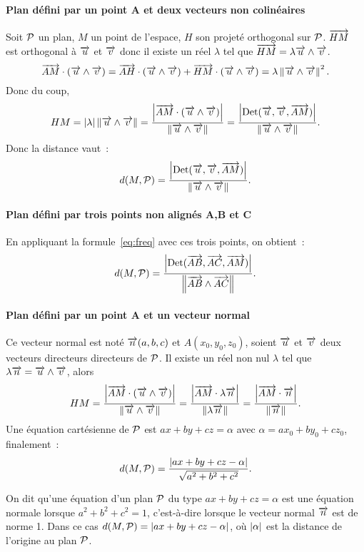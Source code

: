\paragraph{Plan défini par un point A et deux vecteurs non colinéaires}

Soit \(\P\) un plan, \(M\) un point de l'espace, \(H\) son projeté orthogonal sur \(\P\). \(\vect{HM}\) est orthogonal à \(\vu\) et \(\vv\) donc il existe un réel \(\lambda\) tel que \(\vect{HM}=\lambda \vu\wedge\vv\). 
\begin{equation}
  \vect{AM}\cdot(\vu\wedge\vv)=\vect{AH}\cdot(\vu\wedge\vv)+\vect{HM}\cdot(\vu\wedge\vv)=\lambda \norme{\vu\wedge\vv}^2.
\end{equation}
Donc du coup,
\begin{equation}
  HM=\abs{\lambda} \norme{\vu\wedge\vv}=\frac{\abs{\vect{AM}\cdot(\vu\wedge\vv)}}{\norme{\vu\wedge\vv}}=\frac{\abs{\Det(\vu,\vv,\vect{AM})}}{\norme{\vu\wedge\vv}}.
\end{equation}
Donc la distance vaut~:
\begin{equation}
  \label{eq:freq}
  d(M,\P)=\frac{\abs{\Det(\vu,\vv,\vect{AM})}}{\norme{\vu\wedge\vv}}.
\end{equation}

\paragraph{Plan défini par trois points non alignés A,B et C}

En appliquant la formule~\eqref{eq:freq} avec ces trois points, on obtient~:
\begin{equation}
  d(M,\P)=\frac{\abs{\Det(\vect{AB},\vect{AC},\vect{AM})}}{\norme{\vect{AB}\wedge\vect{AC}}}.
\end{equation}

\paragraph{Plan défini par un point A et un vecteur normal}

Ce vecteur normal est noté \(\vn(a,b,c)\) et \(A(x_0,y_0,z_0)\), soient \(\vu\) et \(\vv\) deux vecteurs directeurs directeurs de \(\P\). Il existe un réel non nul \(\lambda\) tel que \(\lambda\vn=\vu\wedge\vv\), alors
\begin{equation}
  HM=\frac{\abs{\vect{AM}\cdot(\vu\wedge\vv)}}{\norme{\vu\wedge\vv}}=\frac{\abs{\vect{AM}\cdot\lambda\vn}}{\norme{\lambda\vn}}=\frac{\abs{\vect{AM}\cdot\vn}}{\norme{\vn}}.
\end{equation}
Une équation cartésienne de \(\P\) est \(ax+by+cz=\alpha\) avec \(\alpha=ax_0+by_0+cz_0\), finalement~:
\begin{equation}
  d(M,\P)=\frac{\abs{ax+by+cz-\alpha}}{\sqrt{a^2+b^2+c^2}}.
\end{equation}
\begin{defdef}
  On dit qu'une équation d'un plan \(\P\) du type \(ax+by+cz=\alpha\) est une équation normale lorsque \(a^2+b^2+c^2=1\), c'est-à-dire lorsque le vecteur normal \(\vn\) est de norme 1. Dans ce cas \(d(M,\P)=\abs{ax+by+cz-\alpha}\), où \(\abs{\alpha}\) est la distance de l'origine au plan \(\P\).
\end{defdef}

